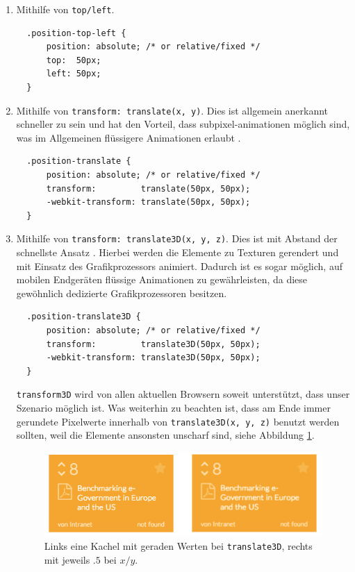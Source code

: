 \documentclass[12pt,twoside]{book}
\begin{document}
\begin{enumerate}
  \item Mithilfe von \texttt{top/left}.\\
  \begin{verbatim}
  .position-top-left {
      position: absolute; /* or relative/fixed */
      top:  50px;
      left: 50px;
  }
  \end{verbatim}
  \item Mithilfe von \texttt{transform: translate(x, y)}. Dies ist allgemein anerkannt schneller zu sein und hat den Vorteil, dass subpixel-animationen möglich sind, was im Allgemeinen flüssigere Animationen erlaubt \cite{translate}. \\
  \begin{verbatim}
  .position-translate {
      position: absolute; /* or relative/fixed */
      transform:         translate(50px, 50px);
      -webkit-transform: translate(50px, 50px);
  }
  \end{verbatim}
  \item Mithilfe von \texttt{transform: translate3D(x, y, z)}. Dies ist mit Abstand der schnellste Ansatz \cite{translate3dvstranslate}. Hierbei werden die Elemente zu Texturen gerendert und mit Einsatz des Grafikprozessors animiert. Dadurch ist es sogar möglich, auf mobilen Endgeräten flüssige Animationen zu gewährleisten, da diese gewöhnlich dedizierte Grafikprozessoren besitzen.
  \begin{verbatim}
  .position-translate3D {
      position: absolute; /* or relative/fixed */
      transform:         translate3D(50px, 50px);
      -webkit-transform: translate3D(50px, 50px);
  }
  \end{verbatim}
  \texttt{transform3D} wird von allen aktuellen Browsern soweit unterstützt, dass unser Szenario möglich ist\cite{transform3d}. Was weiterhin zu beachten ist, dass am Ende immer gerundete Pixelwerte innerhalb von \texttt{translate3D(x, y, z)} benutzt werden sollten, weil die Elemente ansonsten unscharf sind, siehe Abbildung \ref{fig:blurry}.

\begin{figure}[htbp]
	\centering
	\includegraphics[width=1.0\textwidth]{images/blurry_tiles.png}
	\caption{Links eine Kachel mit geraden Werten bei \texttt{translate3D}, rechts mit jeweils $.5$ bei $x/y$.}
	\label{fig:blurry}
\end{figure}

\end{enumerate}
\end{document}
